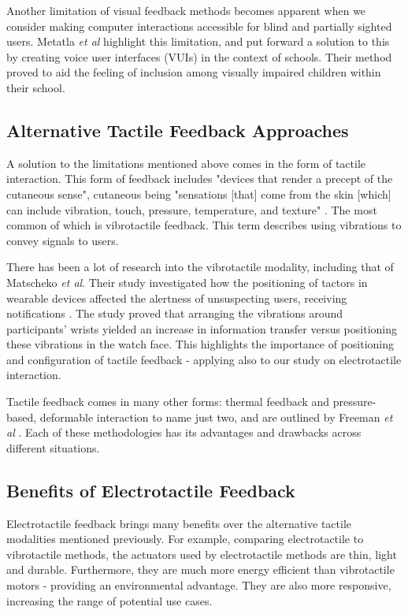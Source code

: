 \documentclass{mpaper}
\begin{document}
Another limitation of visual feedback methods becomes apparent when we consider making computer interactions accessible for blind and partially sighted users. Metatla \emph{et al} \cite{blind_study} highlight this limitation, and put forward a solution to this by creating voice user interfaces (VUIs) in the context of schools. Their method proved to aid the feeling of inclusion among visually impaired children within their school. 

\subsection{Alternative Tactile Feedback Approaches}
A solution to the limitations mentioned above comes in the form of tactile interaction. This form of feedback includes "devices that render a precept of the cutaneous sense", cutaneous being "sensations [that] come from the skin [which] can include vibration, touch, pressure,
temperature, and texture" \cite{multimodal_feedback}. The most common of which is vibrotactile feedback. This term describes using vibrations to convey signals to users. 

There has been a lot of research into the vibrotactile modality, including that of Matscheko \emph{et al}. Their study investigated how the positioning of tactors in wearable devices affected the alertness of unsuspecting users, receiving notifications \cite{vibro_wearables}. The study proved that arranging the vibrations around participants' wrists yielded an increase in information transfer versus positioning these vibrations in the watch face. This highlights the importance of positioning and configuration of tactile feedback - applying also to our study on electrotactile interaction.

Tactile feedback comes in many other forms: thermal feedback and pressure-based, deformable interaction to name just two, and are outlined by Freeman \emph{et al} \cite{multimodal_feedback}. Each of these methodologies has its advantages and drawbacks across different situations. 

\subsection{Benefits of  Electrotactile Feedback}
Electrotactile feedback brings many benefits over the alternative tactile modalities mentioned previously. For example, comparing electrotactile to vibrotactile methods, the actuators used by electrotactile methods are thin, light and durable. Furthermore, they are much more energy efficient than vibrotactile motors - providing an environmental advantage. They are also more responsive, increasing the range of potential use cases. \cite{Alotaibi2023} 
\end{document}
